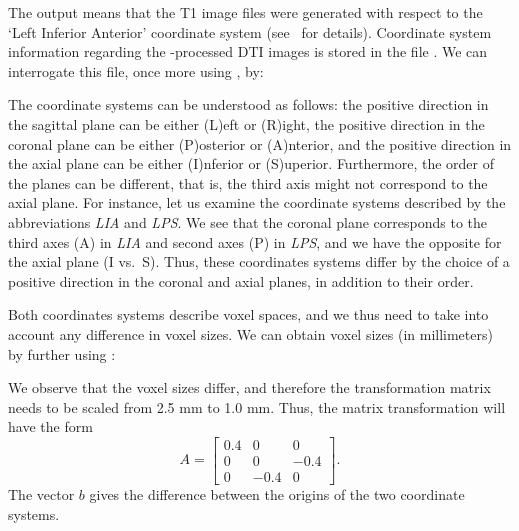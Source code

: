\noindent The output  means that the T1 image files were
generated with respect to the `Left Inferior Anterior' coordinate
system (see~\cite{freesurfer-wiki} for details).  Coordinate system
information regarding the {\freesurfer}-processed DTI images is stored
in the file . We can interrogate this file, once
more using , by:


The coordinate systems can be understood as follows: the positive
direction in the sagittal plane can be either (L)eft or (R)ight, the
positive direction in the coronal plane can be either (P)osterior or
(A)nterior, and the positive direction in the axial plane can be either
(I)nferior or (S)uperior. Furthermore, the order of the planes can be
different, that is, the third axis might not correspond to the axial
plane. For instance, let us examine the coordinate systems described
by the abbreviations \emph{LIA} and \emph{LPS}. We see that the coronal
plane corresponds to the third axes (A) in \emph{LIA} and second axes
(P) in \emph{LPS}, and we have the opposite for the axial plane (I
vs.~S). Thus, these coordinates systems differ by the choice of a 
positive direction in the coronal and axial planes, in addition to
their order.

Both coordinates systems describe voxel spaces, and we thus need to take into 
account any difference in voxel sizes. We can obtain voxel sizes (in millimeters) 
by further using : 


We observe that the voxel sizes differ, and therefore the transformation matrix 
needs to be scaled from 2.5 mm to 1.0 mm. Thus, the matrix transformation will 
have the form 
\[
A = \left[
\begin{array}{ccc}
0.4 & 0 & 0 \\
0 & 0 & -0.4 \\
0 & -0.4 & 0
\end{array}\right].
\]
The vector $b$ gives the difference between the origins of the two
coordinate systems.

